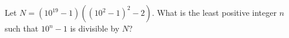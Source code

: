 Let $N=\left(10^{19}-1\right)\left(\left(10^2-1\right)^2-2\right)$. What is the least positive integer $n$ such that $10^n-1$ is divisible by $N$?
